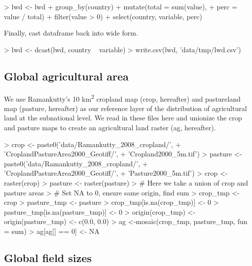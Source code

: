 \documentclass{article}
\begin{document}
\begin{Schunk}
\begin{Sinput}
> lwd <- lwd %>% 
+   group_by(country) %>% 
+   mutate(total = sum(value),
+          perc = value / total) %>%
+    filter(value > 0) %>%
+   select(country, variable, perc)
\end{Sinput}
\end{Schunk}

Finally, cast dataframe back into wide form.
\begin{Schunk}
\begin{Sinput}
> lwd <- dcast(lwd, country ~ variable)
> write.csv(lwd, 'data/tmp/lwd.csv')
\end{Sinput}
\end{Schunk}

\subsection{Global agricultural area}

We use Ramankutty's 10 km\textsuperscript{2} cropland map (crop, hereafter) and pastureland map (pasture, hereafter) as our reference layer of the distribution of agricultural land at the subnational level.  We read in these files here and unionize the crop and pasture maps to create an agricultural land raster (ag, hereafter).

\begin{Schunk}
\begin{Sinput}
> crop <- paste0('data/Ramankutty_2008_cropland/',
+                 'CroplandPastureArea2000_Geotiff/',
+                 'Cropland2000_5m.tif')
> pasture <- paste0('data/Ramankutty_2008_cropland/',
+                   'CroplandPastureArea2000_Geotiff/',
+                   'Pasture2000_5m.tif')
> crop <- raster(crop)
> pasture <- raster(pasture)
> # Here we take a union of crop and pasture areas
> # Set NA to 0, ensure same origin, find sum 
> crop_tmp <- crop
> pasture_tmp <- pasture
> crop_tmp[is.na(crop_tmp)] <- 0
> pasture_tmp[is.na(pasture_tmp)] <- 0
> origin(crop_tmp) <- origin(pasture_tmp) <- c(0.0, 0.0)
> ag <-mosaic(crop_tmp, pasture_tmp, fun = sum)
> ag[ag[] == 0] <- NA 
\end{Sinput}
\end{Schunk}

\subsection{Global field sizes}
\end{document}

